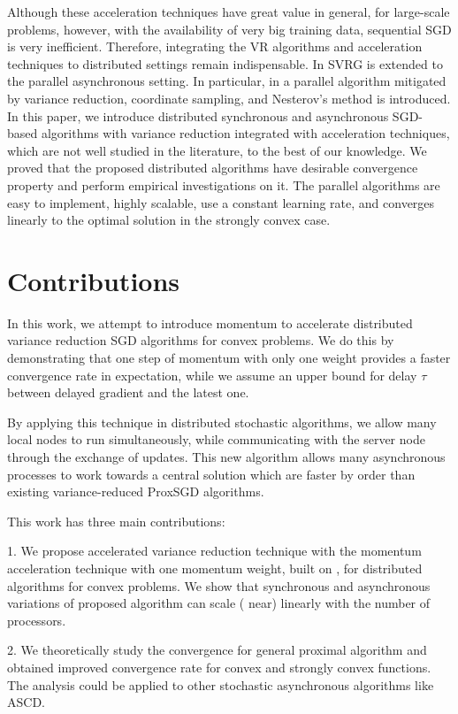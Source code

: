 \documentclass[10pt, conference, compsocconf]{IEEEtran}
\theoremstyle{definition}
\theoremstyle{remark}
\begin{document}
Although these acceleration techniques have great value in general, for large-scale problems, however, with the availability of very big training data, sequential SGD is very inefficient. Therefore, integrating the VR algorithms and acceleration techniques to distributed settings remain indispensable. In \cite{Mania2017, Reddi2015} SVRG is extended to the parallel asynchronous setting. In particular, in \cite{Meng2016} a parallel algorithm mitigated by variance reduction, coordinate sampling, and Nesterov’s method is introduced. In this paper, we introduce distributed synchronous and asynchronous SGD-based algorithms with variance reduction integrated with acceleration techniques, which are not well studied in the literature, to the best of our knowledge. We proved that the proposed distributed algorithms have desirable convergence property and perform empirical investigations on it. The parallel algorithms are easy to implement, highly scalable, use a constant learning rate, and converges linearly to the optimal solution in the strongly convex case.

\section{Contributions}
In this work, we attempt to introduce momentum to accelerate distributed variance reduction SGD algorithms for convex problems. We do this by demonstrating that one step of momentum with only one weight provides a faster convergence rate in expectation, while we assume an upper bound for delay $\tau$ between delayed gradient and the latest one. 

By applying this technique in distributed stochastic algorithms, we allow many local nodes to run simultaneously, while communicating 
with the server node through the exchange of updates. This new algorithm allows many asynchronous processes to work towards a central solution which are
faster by order than existing variance-reduced ProxSGD algorithms. 

This work has three main contributions:

1. We propose accelerated variance reduction technique with the momentum acceleration technique with one momentum weight, built on \cite{Allen-Zhu17}, for distributed algorithms for convex problems. We show that synchronous and asynchronous variations of proposed algorithm can scale ({\color{red} near}) linearly with the number of processors. 

2. We theoretically study the convergence for general proximal algorithm and obtained improved convergence rate for convex and strongly convex functions.
The analysis could be applied to other stochastic asynchronous algorithms like ASCD.
 
\end{document}
